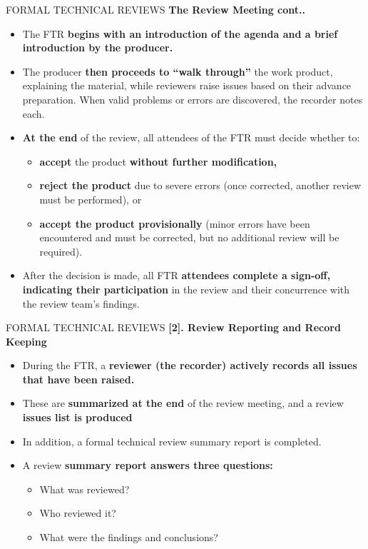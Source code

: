 \documentclass{beamer}
\begin{document}
\begin{frame}{FORMAL TECHNICAL REVIEWS}
	\textbf{The Review Meeting cont..}
	\begin{itemize}

		\item The FTR \textbf{begins with an introduction of the agenda and a brief 
			introduction by the producer.}
		\item The producer \textbf{then proceeds to “walk through” }the work product, 
		explaining the material, while reviewers raise issues based on their 
		advance preparation. When valid problems or errors are discovered, 
		the recorder notes each.
		\item \textbf{At the end }of the review, all attendees of the FTR must decide whether to:
		\begin{itemize}
			\item \textbf{accept }the product \textbf{without further modification,}
			\item \textbf{reject the product} due to severe errors (once corrected, another review 
			must be performed), or

			\item \textbf{ accept the product provisionally }(minor errors have been encountered 
			and must be corrected, but no additional review will be required).
		\end{itemize}
	\item After the decision is made, all FTR\textbf{ attendees complete a sign-off, indicating 
		their participation} in the review and their concurrence with the review 
	team’s findings.
	\end{itemize}
\end{frame}

\begin{frame}{FORMAL TECHNICAL REVIEWS}
	\textbf{[2]. Review Reporting and Record Keeping}
	\begin{itemize}
		\item During the FTR, a \textbf{reviewer (the recorder) actively records all issues 
			that have been raised.}
		\item These are \textbf{summarized at the end} of the review meeting, and a review 
		\textbf{issues list is produced}
		\item In addition, a formal technical review summary report is completed.
		\item A review \textbf{summary report answers three questions:}
		\begin{itemize}
			\item What was reviewed? 
			\item Who reviewed it? 
			\item What were the findings and conclusions?
			
		\end{itemize}
	\end{itemize}
\end{frame}
\end{document}
